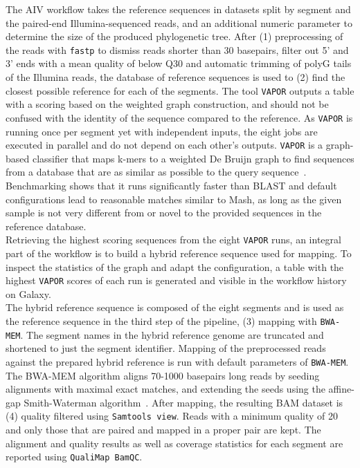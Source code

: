 The \ac{AIV} workflow takes the reference sequences in datasets split by segment and the paired-end Illumina-sequenced reads, and an additional numeric parameter to determine the size of the produced phylogenetic tree. After (1) preprocessing of the reads with \texttt{fastp} to dismiss reads shorter than 30 basepairs, filter out 5' and 3' ends with a mean quality of below Q30 and automatic trimming of polyG tails of the Illumina reads, the database of reference sequences is used to (2) find the closest possible reference for each of the segments. The tool \texttt{VAPOR} outputs a table with a scoring based on the weighted graph construction, and should not be confused with the identity of the sequence compared to the reference. As \texttt{VAPOR} is running once per segment yet with independent inputs, the eight jobs are executed in parallel and do not depend on each other's outputs. \texttt{VAPOR} is a graph-based classifier that maps k-mers to a weighted De Bruijn graph to find sequences from a database that are as similar as possible to the query sequence~\cite{southgate2020influenza}. Benchmarking shows that it runs significantly faster than \ac{BLAST} and default configurations lead to reasonable matches similar to Mash, as long as the given sample is not very different from or novel to the provided sequences in the reference database. \\
Retrieving the highest scoring sequences from the eight \texttt{VAPOR} runs, an integral part of the workflow is to build a hybrid reference sequence used for mapping. To inspect the statistics of the graph and adapt the configuration, a table with the highest \texttt{VAPOR} scores of each run is generated and visible in the workflow history on Galaxy. \\
The hybrid reference sequence is composed of the eight segments and is used as the reference sequence in the third step of the pipeline, (3) mapping with \texttt{BWA-MEM}. The segment names in the hybrid reference genome are truncated and shortened to just the segment identifier. Mapping of the preprocessed reads against the prepared hybrid reference is run with default parameters of \texttt{BWA-MEM}. The \ac{BWA-MEM} algorithm aligns 70-1000 basepairs long reads by seeding alignments with maximal exact matches, and extending the seeds using the affine-gap Smith-Waterman algorithm~\cite{li2013aligning}. After mapping, the resulting \ac{BAM} dataset is (4) quality filtered using \texttt{Samtools view}. Reads with a minimum quality of 20 and only those that are paired and mapped in a proper pair are kept. The alignment and quality results as well as coverage statistics for each segment are reported using \texttt{QualiMap BamQC}. \\
